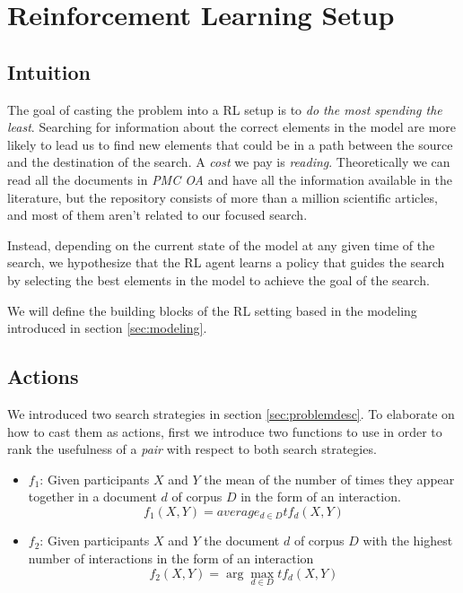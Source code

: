 \documentclass[12pt]{article}
\begin{document}
\section{Reinforcement Learning Setup}
\label{sec:rl}

\subsection{Intuition}
The goal of casting the problem into a RL setup is to \emph{do the most spending the least}. Searching for information about the correct elements in the model are more likely to lead us to find new elements that could be in a path between the source and the destination of the search. A \emph{cost} we pay is \emph{reading}. Theoretically we can read all the documents in \emph{PMC OA} and have all the information available in the literature, but the repository consists of more than a million scientific articles, and most of them aren't related to our focused search.

Instead, depending on the current state of the model at any given time of the search, we hypothesize that the RL agent learns a policy that guides the search by selecting the best elements in the model to achieve the goal of the search.

We will define the building blocks of the RL setting based in the modeling introduced in section \ref{sec:modeling}.

\subsection{Actions}
We introduced two search strategies in section \ref{sec:problemdesc}. To elaborate on how to cast them as actions, first we introduce two functions to use in order to rank the usefulness of a \emph{pair} with respect to both search strategies.

\begin{itemize}
  \item $f_1$: Given participants $X$ and $Y$ the mean of the number of times they appear together in a document $d$ of corpus $D$ in the form of an interaction.  		\begin{equation}
  \label{eq:f1}
  			f_1(X,Y) = average_{d\in D} tf_d(X,Y)
		\end{equation}
		
		\item $f_2$: Given participants $X$ and $Y$ the document $d$ of corpus $D$ with the highest number of interactions in the form of an interaction
		\begin{equation}
		\label{eq:f2}
  		f_2(X,Y) = \arg\max_{d\in D} tf_d(X,Y)
\end{equation}
\end{itemize}
\end{document}
